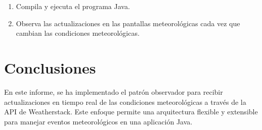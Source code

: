 \documentclass{article}
\begin{document}
\begin{enumerate}
    \item Compila y ejecuta el programa Java.
    \item Observa las actualizaciones en las pantallas meteorológicas cada vez que cambian las condiciones meteorológicas.
\end{enumerate}

\section{Conclusiones}
En este informe, se ha implementado el patrón observador para recibir actualizaciones en tiempo real de las condiciones meteorológicas a través de la API de Weatherstack. Este enfoque permite una arquitectura flexible y extensible para manejar eventos meteorológicos en una aplicación Java.
\end{document}
